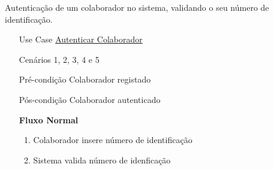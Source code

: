 \documentclass[../relatorio.tex]{subfiles}
\begin{document}
Autenticação de um colaborador no sistema, validando o seu número de identificação.
\begin{itemize}
    \item[Use Case] {\underline{Autenticar Colaborador}}
    \item[Cenários] {1, 2, 3, 4 e 5}
    \item[Pré-condição] {Colaborador registado}
    \item[Pós-condição] {Colaborador autenticado}
          \begin{flushleft}
              \textbf{Fluxo Normal}
          \end{flushleft}
          \begin{enumerate}
              \item Colaborador insere número de identificação
              \item Sistema valida número de idenficação
          \end{enumerate}
\end{itemize}
\end{document}
